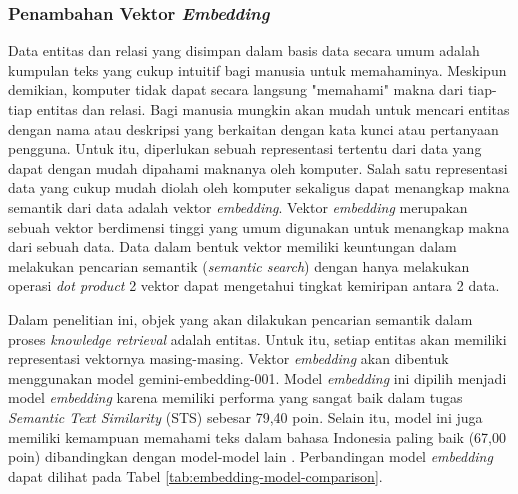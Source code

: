 \subsubsection{Penambahan Vektor \textit{Embedding}}

Data entitas dan relasi yang disimpan dalam basis data secara umum adalah kumpulan teks yang cukup intuitif bagi manusia untuk memahaminya.
Meskipun demikian, komputer tidak dapat secara langsung "memahami" makna dari tiap-tiap entitas dan relasi.
Bagi manusia mungkin akan mudah untuk mencari entitas dengan nama atau deskripsi yang berkaitan dengan kata kunci atau pertanyaan pengguna.
Untuk itu, diperlukan sebuah representasi tertentu dari data yang dapat dengan mudah dipahami maknanya oleh komputer.
Salah satu representasi data yang cukup mudah diolah oleh komputer sekaligus dapat menangkap makna semantik dari data adalah vektor \textit{embedding}.
Vektor \textit{embedding} merupakan sebuah vektor berdimensi tinggi yang umum digunakan untuk menangkap makna dari sebuah data.
Data dalam bentuk vektor memiliki keuntungan dalam melakukan pencarian semantik (\textit{semantic search}) dengan hanya melakukan operasi \textit{dot product} 2 vektor dapat mengetahui tingkat kemiripan antara 2 data.

Dalam penelitian ini, objek yang akan dilakukan pencarian semantik dalam proses \textit{knowledge retrieval} adalah entitas.
Untuk itu, setiap entitas akan memiliki representasi vektornya masing-masing.
Vektor \textit{embedding} akan dibentuk menggunakan model gemini-embedding-001.
Model \textit{embedding} ini dipilih menjadi model \textit{embedding} karena memiliki performa yang sangat baik dalam tugas \textit{Semantic Text Similarity} (STS) sebesar 79,40 poin.
Selain itu, model ini juga memiliki kemampuan memahami teks dalam bahasa Indonesia paling baik (67,00 poin) dibandingkan dengan model-model lain \cite{enevoldsen2025MMTEBmassivemultilingualtextEmbeddingModelComp}.
Perbandingan model \textit{embedding} dapat dilihat pada Tabel \ref{tab:embedding-model-comparison}.

